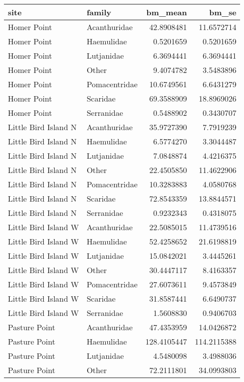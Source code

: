 \documentclass[
]{article}
\begin{document}
\begin{longtable}[]{@{}llrr@{}}
\toprule()
site & family & bm\_mean & bm\_se \\
\midrule()
\endhead
Homer Point & Acanthuridae & 42.8908481 & 11.6572714 \\
Homer Point & Haemulidae & 0.5201659 & 0.5201659 \\
Homer Point & Lutjanidae & 6.3694441 & 6.3694441 \\
Homer Point & Other & 9.4074782 & 3.5483896 \\
Homer Point & Pomacentridae & 10.6749561 & 6.6431279 \\
Homer Point & Scaridae & 69.3588909 & 18.8969026 \\
Homer Point & Serranidae & 0.5488902 & 0.3430707 \\
Little Bird Island N & Acanthuridae & 35.9727390 & 7.7919239 \\
Little Bird Island N & Haemulidae & 6.5774270 & 3.3044487 \\
Little Bird Island N & Lutjanidae & 7.0848874 & 4.4216375 \\
Little Bird Island N & Other & 22.4505850 & 11.4622906 \\
Little Bird Island N & Pomacentridae & 10.3283883 & 4.0580768 \\
Little Bird Island N & Scaridae & 72.8543359 & 13.8844571 \\
Little Bird Island N & Serranidae & 0.9232343 & 0.4318075 \\
Little Bird Island W & Acanthuridae & 22.5085015 & 11.4739516 \\
Little Bird Island W & Haemulidae & 52.4258652 & 21.6198819 \\
Little Bird Island W & Lutjanidae & 15.0842021 & 3.4445261 \\
Little Bird Island W & Other & 30.4447117 & 8.4163357 \\
Little Bird Island W & Pomacentridae & 27.6073611 & 9.4573849 \\
Little Bird Island W & Scaridae & 31.8587441 & 6.6490737 \\
Little Bird Island W & Serranidae & 1.5608830 & 0.9406703 \\
Pasture Point & Acanthuridae & 47.4353959 & 14.0426872 \\
Pasture Point & Haemulidae & 128.4105447 & 114.2115388 \\
Pasture Point & Lutjanidae & 4.5480098 & 3.4988036 \\
Pasture Point & Other & 72.2111801 & 34.0993803 \\

\end{longtable}
\end{document}
